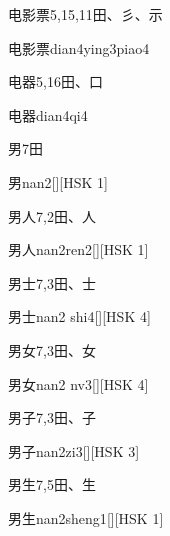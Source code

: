 \begin{entry}{电影票}{5,15,11}{⽥、⼺、⽰}
  \begin{phonetics}{电影票}{dian4ying3piao4}
  \end{phonetics}
\end{entry}

\begin{entry}{电器}{5,16}{⽥、⼝}
  \begin{phonetics}{电器}{dian4qi4}
  \end{phonetics}
\end{entry}

\begin{entry}{男}{7}{⽥}
  \begin{phonetics}{男}{nan2}[][HSK 1]
  \end{phonetics}
\end{entry}

\begin{entry}{男人}{7,2}{⽥、⼈}
  \begin{phonetics}{男人}{nan2ren2}[][HSK 1]
  \end{phonetics}
\end{entry}

\begin{entry}{男士}{7,3}{⽥、⼠}
  \begin{phonetics}{男士}{nan2 shi4}[][HSK 4]
  \end{phonetics}
\end{entry}

\begin{entry}{男女}{7,3}{⽥、⼥}
  \begin{phonetics}{男女}{nan2 nv3}[][HSK 4]
  \end{phonetics}
\end{entry}

\begin{entry}{男子}{7,3}{⽥、⼦}
  \begin{phonetics}{男子}{nan2zi3}[][HSK 3]
  \end{phonetics}
\end{entry}

\begin{entry}{男生}{7,5}{⽥、⽣}
  \begin{phonetics}{男生}{nan2sheng1}[][HSK 1]
  \end{phonetics}
\end{entry}

